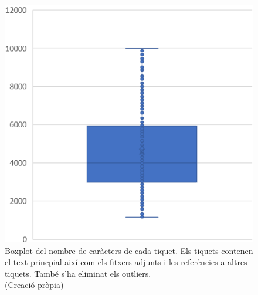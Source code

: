 \begin{figure}[H]
    \centering
    \includegraphics[width=\textwidth]{boxplot_num_chars_adj_refs_outliers.png}
    \caption[Boxplot dels caràcters de cada tiquet amb adjunts i referències i sense outliers]{Boxplot del nombre de caràcters de cada tiquet. Els tiquets contenen el text princpial així com els fitxers adjunts i les referències a altres tiquets. També s'ha eliminat els outliers. \\ (Creació pròpia)}
    \label{fig:boxplot_num_chars_adj_refs_outliers}
\end{figure}



